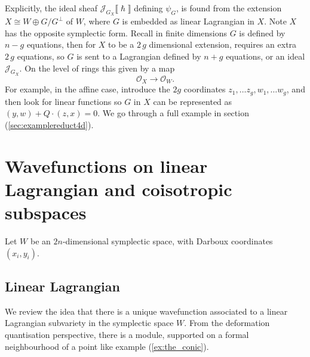     
    Explicitly, the ideal sheaf \(\mathcal{J}_{G_X} \lBrack \hslash \rBrack \) defining \( \psi_G \), is found from the extension \(X \cong W \oplus G/G^{\perp}\) of \(W\), where \(G\) is embedded as linear Lagrangian in \(X\). Note \(X\) has the opposite symplectic form. Recall in finite dimensions \(G\) is defined by \(n-g\) equations, then for \(X\) to be a \(2\,g\) dimensional extension, requires an extra \(2
    \,g\) equations, so \(G\) is sent to a Lagrangian defined by \(n+g\) equations, or an ideal \( \mathcal{J}_{G_X}\). On the level of rings this given by a map
    \[ \mathcal{O}_{X} \rightarrow \mathcal{O}_W. \]
    For example, in the affine case, introduce the \(2g\) coordinates \(z_1, \dots z_g, w_1, \dots w_g\), and then look for linear functions so \(G\) in \(X\) can be represented as \((y,w) + Q \cdot (z,x)=0\). We go through a full example in section (\ref{sec:examplereduct4d}).

    \section{Wavefunctions on linear Lagrangian and coisotropic subspaces}
    
    Let \(W\) be an \(2n\)-dimensional symplectic space, with Darboux coordinates \((x_i,y_i)\).

    \subsection{Linear Lagrangian}
    \label{sec:linearlag}
    We review the idea that there is a unique wavefunction associated to a linear Lagrangian subvariety in the symplectic space \(W\). From the deformation quantisation perspective, there is a module, supported on a formal neighbourhood of a point like example (\ref{ex:the_conic}). 
    
